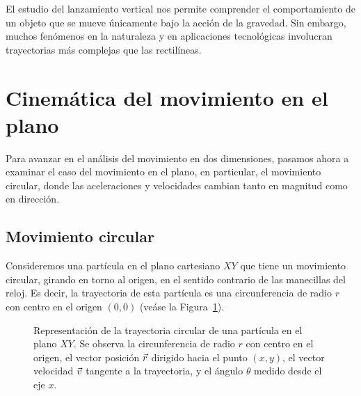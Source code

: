 El estudio del lanzamiento vertical nos permite comprender el comportamiento de un objeto que se mueve únicamente bajo la acción de la gravedad. Sin embargo, muchos fenómenos en la naturaleza y en aplicaciones tecnológicas involucran trayectorias más complejas que las rectilíneas.

\section{Cinemática del movimiento en el plano}

Para avanzar en el análisis del movimiento en dos dimensiones, pasamos ahora a examinar el caso del movimiento en el plano, en particular, el movimiento circular, donde las aceleraciones y velocidades cambian tanto en magnitud como en dirección.

\subsection{Movimiento circular}

Consideremos una partícula en el plano cartesiano $XY$ que tiene un movimiento circular, girando en torno al origen, en el sentido contrario de las manecillas del reloj. Es decir, la trayectoria de esta partícula es una circunferencia de radio $r$ con centro en el origen $(0,0)$ (veáse la Figura~\ref{fig:trayectoria}).
\begin{figure}
    \centering
    \caption{Representación de la trayectoria circular de una partícula en el plano $XY$. Se observa la circunferencia de radio $r$ con centro en el origen, el vector posición $\vec{r}$ dirigido hacia el punto $(x,y)$, el vector velocidad $\vec{v}$ tangente a la trayectoria, y el ángulo $\theta$ medido desde el eje $x$.}
    \label{fig:trayectoria}
\end{figure}

